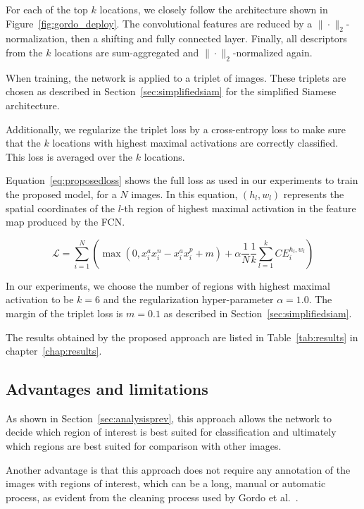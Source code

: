 For each of the top $k$ locations, we closely follow the architecture
shown in
Figure~\ref{fig:gordo_deploy}. The convolutional features are
reduced by a $\|\cdot\|_2$-normalization, then a shifting and fully connected
layer. Finally, all descriptors from the $k$ locations are
sum-aggregated and $\|\cdot\|_2$-normalized again.

When training, the network is applied to a triplet of images.
These triplets are chosen as described in Section~\ref{sec:simplifiedsiam}
for the simplified Siamese architecture.

Additionally, we regularize the triplet loss by a cross-entropy loss
to make sure that the $k$ locations with highest
maximal activations are correctly classified. This loss is averaged over
the $k$ locations.

Equation~\ref{eq:proposedloss} shows the full loss as used in our
experiments to train the proposed model, for a $N$ images. In this
equation, $(h_l, w_l)$ represents the spatial coordinates of the $l$-th
region of highest maximal activation in the feature map produced by
the FCN.

\begin{equation}\label{eq:proposedloss}
\mathcal{L} = \sum_{i=1}^N \left( \max(0, x^a_i x^n_i - x^a_i x^p_i + m) +
\alpha \frac{1}{N} \frac{1}{k} \sum_{l=1}^k \mathit{CE}_i^{h_l,w_l} \right)
\end{equation}

In our experiments, we choose the number of regions with highest maximal
activation to be $k=6$ and the regularization hyper-parameter $\alpha=1.0$.
The margin of the triplet loss is $m=0.1$ as described in
Section~\ref{sec:simplifiedsiam}.

The results obtained by the proposed approach are listed in Table~\ref{tab:results} in chapter~\ref{chap:results}.

\subsection{Advantages and limitations}
As shown in Section~\ref{sec:analysisprev}, this approach
allows the network to decide which region of interest is
best suited for classification and ultimately which regions
are best suited for comparison with other images.

Another advantage is that this approach does not require
any annotation of the images with regions of interest,
which can be a long, manual or automatic process, as evident
from the cleaning process used by Gordo et al.~\cite{gordo_end--end_2017}.

